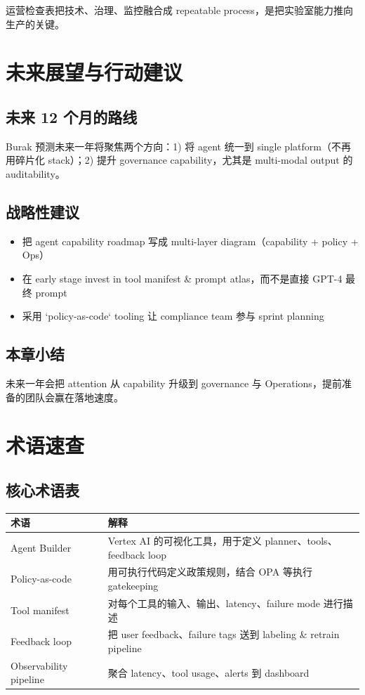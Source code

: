 \documentclass[a4paper]{article}
\begin{document}
运营检查表把技术、治理、监控融合成 repeatable process，是把实验室能力推向生产的关键。

\section{未来展望与行动建议}

\subsection{未来 12 个月的路线}

Burak 预测未来一年将聚焦两个方向：1) 将 agent 统一到 single platform（不再用碎片化 stack）；2) 提升 governance capability，尤其是 multi-modal output 的 auditability。

\subsection{战略性建议}

\begin{itemize}
    \item 把 agent capability roadmap 写成 multi-layer diagram（capability + policy + Ops）
    \item 在 early stage invest in tool manifest \& prompt atlas，而不是直接 GPT-4 最终 prompt
    \item 采用 `policy-as-code` tooling 让 compliance team 参与 sprint planning
\end{itemize}

\subsection{本章小结}

未来一年会把 attention 从 capability 升级到 governance 与 Operations，提前准备的团队会赢在落地速度。

\section{术语速查}

\subsection{核心术语表}

\begin{tabular}{p{} p{}}
\toprule
术语 & 解释 \\
\midrule
Agent Builder & Vertex AI 的可视化工具，用于定义 planner、tools、feedback loop \\
Policy-as-code & 用可执行代码定义政策规则，结合 OPA 等执行 gatekeeping \\
Tool manifest & 对每个工具的输入、输出、latency、failure mode 进行描述 \\
Feedback loop & 把 user feedback、failure tags 送到 labeling \& retrain pipeline \\
Observability pipeline & 聚合 latency、tool usage、alerts 到 dashboard \\
\bottomrule
\end{tabular}
\end{document}
